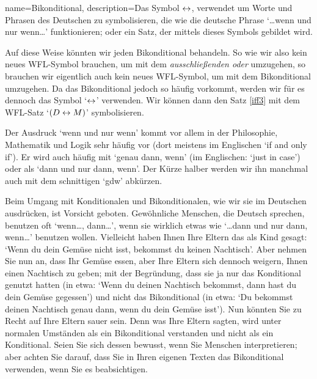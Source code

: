 {
name=Bikonditional,
description={Das Symbol $\leftrightarrow$, verwendet um Worte und Phrasen des Deutschen zu symbolisieren, die wie die deutsche Phrase `\dots wenn und nur wenn\dots' funktionieren; oder ein Satz, der mittels dieses Symbols gebildet wird.}
}

Auf diese Weise könnten wir jeden Bikonditional behandeln. So wie wir also kein neues WFL-Symbol brauchen, um mit dem \emph{ausschlie{\ss}enden oder} umzugehen, so brauchen wir eigentlich auch kein neues WFL-Symbol, um mit dem Bikonditional umzugehen. Da das Bikonditional jedoch so häufig vorkommt, werden wir für es dennoch das Symbol `$\leftrightarrow$' verwenden. Wir können dann den Satz \ref{iff3} mit dem WFL-Satz `$(D \leftrightarrow M)$' symbolisieren. 

Der Ausdruck `wenn und nur wenn' kommt vor allem in der Philosophie, Mathematik und Logik sehr häufig vor (dort meistens im Englischen `if and only if'). Er wird auch häufig mit `genau dann, wenn' (im Englischen: `just in case') oder als `dann und nur dann, wenn'. Der Kürze halber werden wir ihn manchmal auch mit dem schnittigen `gdw' abkürzen. 


Beim Umgang mit Konditionalen und Bikonditionalen, wie wir sie im Deutschen ausdrücken, ist Vorsicht geboten. Gewöhnliche Menschen, die Deutsch sprechen, benutzen oft `wenn\dots, dann\dots', wenn sie wirklich etwas wie `\dots dann und nur dann, wenn\dots' benutzen wollen. Vielleicht haben Ihnen Ihre Eltern das als Kind gesagt: `Wenn du dein Gemüse nicht isst, bekommst du keinen Nachtisch'. Aber nehmen Sie nun an, dass Ihr Gemüse essen, aber Ihre Eltern sich dennoch weigern, Ihnen einen Nachtisch zu geben; mit der Begründung, dass sie ja nur das Konditional genutzt hatten (in etwa: `Wenn du deinen Nachtisch bekommst, dann hast du dein Gemüse gegessen') und nicht das Bikonditional (in etwa: `Du bekommst deinen Nachtisch genau dann, wenn du dein Gemüse isst'). Nun könnten Sie zu Recht auf Ihre Eltern sauer sein. Denn was Ihre Eltern sagten, wird unter normalen Umständen als ein Bikonditional verstanden und nicht als ein Konditional. Seien Sie sich dessen bewusst, wenn Sie Menschen interpretieren; aber achten Sie darauf, dass Sie in Ihren eigenen Texten das Bikonditional verwenden, wenn Sie es beabsichtigen.

